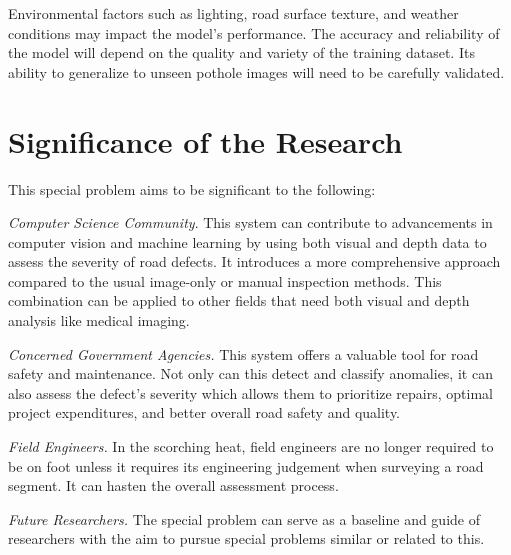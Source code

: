 Environmental factors such as lighting, road surface texture, and weather conditions may impact the model's performance. The accuracy and reliability of the model will depend on the quality and variety of the training dataset. Its ability to generalize to unseen pothole images will need to be carefully validated.


\section{Significance of the Research}
\label{sec:significance}

This special problem aims to be significant to the following:


\textit{Computer Science Community}. This system can contribute to advancements in computer vision and machine learning by using both visual and depth data to assess the severity of road defects. It introduces a more comprehensive approach compared to the usual image-only or manual inspection methods. This combination can be applied to other fields that need both visual and depth analysis like medical imaging. 


\textit{Concerned Government Agencies.} This system offers a valuable tool for road safety and maintenance. Not only can this detect and classify anomalies, it can also assess the defect’s severity which allows them to prioritize repairs, optimal project expenditures, and better overall road safety and quality. 


\textit{Field Engineers.} In the scorching heat, field engineers are no longer required to be on foot unless it requires its engineering judgement when surveying a road segment. It can hasten the overall assessment process. 


\textit{Future Researchers.} The special problem can serve as a baseline and guide of researchers with the aim to pursue special problems similar or related to this. 


